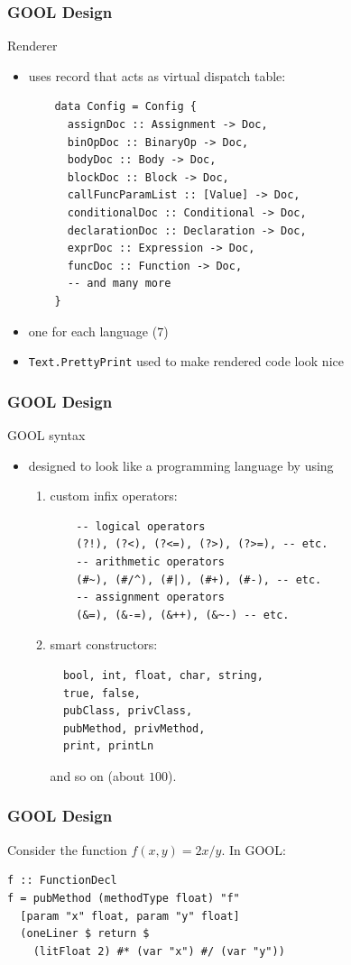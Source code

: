 \documentclass{beamer}
\begin{document}
\begin{frame}
\frametitle{GOOL Design}
{\Large Renderer}
\begin{itemize} 
\item uses record that acts as virtual dispatch table:
\begin{lstlisting}
    data Config = Config {
      assignDoc :: Assignment -> Doc,
      binOpDoc :: BinaryOp -> Doc,
      bodyDoc :: Body -> Doc,
      blockDoc :: Block -> Doc,
      callFuncParamList :: [Value] -> Doc,
      conditionalDoc :: Conditional -> Doc,
      declarationDoc :: Declaration -> Doc,
      exprDoc :: Expression -> Doc,
      funcDoc :: Function -> Doc,
      -- and many more
    }
\end{lstlisting}
\item one for each language ($7$)
\item \lstinline|Text.PrettyPrint| used to make rendered code look nice
\end{itemize}
\end{frame}


\begin{frame}
\frametitle{GOOL Design}
{\Large GOOL syntax}
\begin{itemize}
\item designed to look like a programming language by using
\begin{enumerate}
\item<2-> custom infix operators:
\begin{lstlisting}
    -- logical operators
    (?!), (?<), (?<=), (?>), (?>=), -- etc.
    -- arithmetic operators
    (#~), (#/^), (#|), (#+), (#-), -- etc.
    -- assignment operators
    (&=), (&-=), (&++), (&~-) -- etc.
\end{lstlisting}
\item<3-> smart constructors:
\begin{lstlisting}
  bool, int, float, char, string,
  true, false,
  pubClass, privClass, 
  pubMethod, privMethod,
  print, printLn
\end{lstlisting}
and so on (about $100$).
\end{enumerate}
\end{itemize}
\end{frame}

\begin{frame}
\frametitle{GOOL Design}
Consider the function $f(x, y) = 2x/y$.  In GOOL:
\begin{lstlisting}
f :: FunctionDecl
f = pubMethod (methodType float) "f"
  [param "x" float, param "y" float] 
  (oneLiner $ return $ 
    (litFloat 2) #* (var "x") #/ (var "y"))
\end{lstlisting}
\end{frame}
\end{document}
